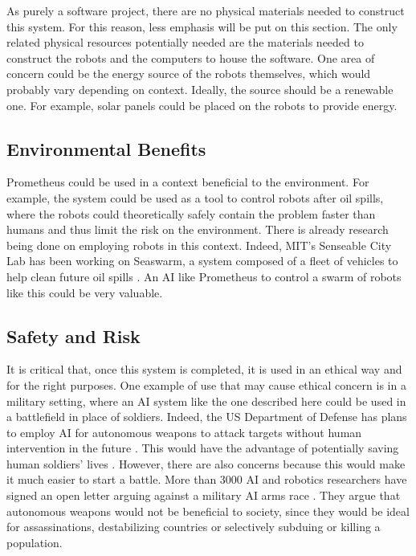 \documentclass[titlepage,11pt]{article}
\begin{document}
As purely a software project, there are no physical materials needed to construct this system. For this reason, less emphasis will be put on this section. The only related physical resources potentially needed are the materials needed to construct the robots and the computers to house the software. One area of concern could be the energy source of the robots themselves, which would probably vary depending on context. Ideally, the source should be a renewable one. For example, solar panels could be placed on the robots to provide energy.

\subsection{Environmental Benefits}

Prometheus could be used in a context beneficial to the environment. For example, the system could be used as a tool to control robots after oil spills, where the robots could theoretically safely contain the problem faster than humans and thus limit the risk on the environment. There is already research being done on employing robots in this context. Indeed, MIT's Senseable City Lab has been working on Seaswarm, a system composed of a fleet of vehicles to help clean future oil spills \cite{seaswarm}. An AI like Prometheus to control a swarm of robots like this could be very valuable. 

\subsection{Safety and Risk}

It is critical that, once this system is completed, it is used in an ethical way and for the right purposes. One example of use that may cause ethical concern is in a military setting, where an AI system like the one described here could be used in a battlefield in place of soldiers. Indeed, the US Department of Defense has plans to employ AI for autonomous weapons to attack targets without human intervention in the future \cite{military}. This would have the advantage of potentially saving human soldiers' lives \cite{define_military_ai}. However, there are also concerns because this would make it much easier to start a battle. More than 3000 AI and robotics researchers have signed an open letter arguing against a military AI arms race \cite{openletter}. They argue that autonomous weapons would not be beneficial to society, since they would be ideal for assassinations, destabilizing countries or selectively subduing or killing a population.
\end{document}

